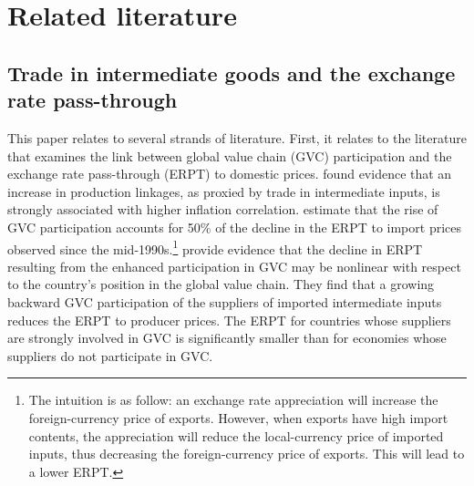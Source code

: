 \documentclass[12pt,a4paper]{paper}
\begin{document}
\label{sec:intro}


\section{Related literature}
\label{sec:lit}

\subsection{Trade in intermediate goods and the exchange rate pass-through} 

This paper relates to several strands of literature.
First, it relates to the literature that examines the link between global value chain (GVC) participation and the exchange rate pass-through (ERPT) to domestic prices. \cite{DeSoyres2018} found evidence that an increase in production linkages, as proxied by trade in intermediate inputs, is strongly associated with higher inflation correlation. 
\cite{Georgiadis2019} estimate that the rise of GVC participation accounts for 50\% of the decline in the ERPT to import prices observed since the mid-1990s.\footnote{The intuition is as follow: an exchange rate appreciation will increase the foreign-currency price of exports. However, when exports have high import contents, the appreciation will reduce the local-currency price of imported inputs, thus decreasing the foreign-currency price of exports. This will lead to a lower ERPT. }
\cite{Hagemejer2020} provide evidence that the decline in ERPT resulting from the enhanced participation in GVC may be nonlinear with respect to the country's position in the global value chain.
They find that a growing backward GVC participation of the suppliers of imported intermediate inputs reduces the ERPT to producer prices. 
The ERPT for countries whose suppliers are strongly involved in GVC is significantly smaller than for economies whose suppliers do not participate in GVC. 
\end{document}

